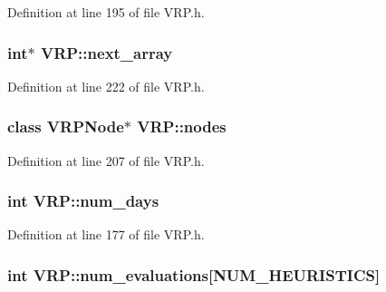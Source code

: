 Definition at line 195 of file VRP.h.

\hypertarget{class_v_r_p_acd2b81d8d25db522d089a33b212107ce}{
\subsubsection[{next\_\-array}]{\setlength{\rightskip}{0pt plus 5cm}int$\ast$ {\bf VRP::next\_\-array}}}
\label{class_v_r_p_acd2b81d8d25db522d089a33b212107ce}


Definition at line 222 of file VRP.h.

\hypertarget{class_v_r_p_a35f503e16fdbf0d9bd3e79d79bc70acd}{
\subsubsection[{nodes}]{\setlength{\rightskip}{0pt plus 5cm}class {\bf VRPNode}$\ast$ {\bf VRP::nodes}}}
\label{class_v_r_p_a35f503e16fdbf0d9bd3e79d79bc70acd}


Definition at line 207 of file VRP.h.

\hypertarget{class_v_r_p_aca4af6860b5f2e6f8b9d2d962bc08d92}{
\subsubsection[{num\_\-days}]{\setlength{\rightskip}{0pt plus 5cm}int {\bf VRP::num\_\-days}}}
\label{class_v_r_p_aca4af6860b5f2e6f8b9d2d962bc08d92}


Definition at line 177 of file VRP.h.

\hypertarget{class_v_r_p_a5adda95e03e133206d5fbcdf742954e0}{
\subsubsection[{num\_\-evaluations}]{\setlength{\rightskip}{0pt plus 5cm}int {\bf VRP::num\_\-evaluations}\mbox{[}NUM\_\-HEURISTICS\mbox{]}}}
\label{class_v_r_p_a5adda95e03e133206d5fbcdf742954e0}


